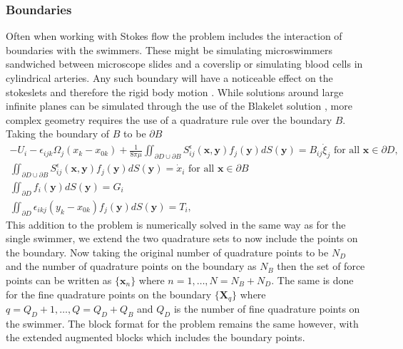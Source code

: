 \subsubsection{Boundaries} \label{sec:boundries}
Often when working with Stokes flow the problem includes the interaction of boundaries with the swimmers. These might be simulating microswimmers sandwiched between microscope slides and a coverslip \cite{Gallagher2019RapidAnalysis} or simulating blood cells in cylindrical arteries. Any such boundary will have a noticeable effect on the stokeslets and therefore the rigid body motion \cite{Liron1981ExistenceBoundaries}. While solutions around large infinite planes can be simulated through the use of the Blakelet solution \cite{Ainley2008TheStokeslets,Cortez2015}, more complex geometry requires the use of a quadrature rule over the boundary $B$. Taking the boundary of $B$ to be $\partial B$
\begin{equation}
\label{eq:swimmingProblemBnd}
\begin{gathered}
    -U_{i}-\epsilon_{i j k} \Omega_{j}\left(x_{k}-x_{0 k}\right)+\frac{1}{8 \pi\mu} \iint_{\partial D \cup \partial B} S_{i j}^{\epsilon}(\bm{x}, \bm{y}) f_{j}(\bm{y}) d S({\bm{y}})=B_{i j} \dot{\xi}_{j} \text { for all } \bm{x} \in \partial D, \\
    \iint_{\partial D \cup \partial B} S_{i j}^{\epsilon}(\bm{x}, \bm{y}) f_{j}(\bm{y}) d S({\bm{y}}) = \dot{x}_i \text { for all } \bm{x} \in \partial B \\
    \iint_{\partial D} f_{i}(\bm{y}) d S({\bm{y}})=G_i \\
    \iint_{\partial D} \epsilon_{i k j} (y_{k}-x_{0 k}) f_{j}(\bm{y}) d S({\bm{y}})=T_i,
\end{gathered}
\end{equation}
This addition to the problem is numerically solved in the same way as for the single swimmer, we extend the two quadrature sets to now include the points on the boundary. Now taking the original number of quadrature points to be $N_D$ and the number of quadrature points on the boundary as $N_B$ then the set of force points can be written as  $\{\bm{x}_n\}$ where $n=1,\dots,N=N_B+N_D$. The same is done for the fine quadrature points on the boundary $\{\bm{X}_q\}$ where $q=Q_D+1,\dots,Q=Q_D+Q_B$ and $Q_D$ is the number of fine quadrature points on the swimmer. The block format for the problem remains the same however, with the extended augmented blocks which includes the boundary points. 

